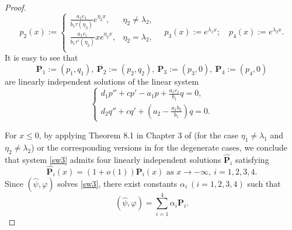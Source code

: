\documentclass[reqno]{amsart}
\theoremstyle{plain}
\theoremstyle{definition}
\theoremstyle{remark}
\begin{document}
\begin{proof}
\[		p_2(x):= \begin{cases}
			\frac{a_1c_1}{b_1\tau(\eta_2)}e^{\eta_2 x}, &  \eta_2 \neq \lambda_2,\\
			\frac{a_1c_1}{b_1\tau'(\eta_2)}xe^{\eta_2 x}, &  \eta_2 = \lambda_2,\\
		\end{cases} \quad
		p_3(x) := e^{\lambda_1 x}; \quad p_4(x) := e^{\lambda_2 x}.
		\]
		It is easy to see that 
		\[
		\mathbf{P}_1 := (p_1, q_1), ~ \mathbf{P}_2 := (p_2, q_2),~\mathbf{P}_3 := (p_3, 0),~\mathbf{P}_4 := (p_4, 0)
		\]
		are linearly independent solutions of the linear system
		\[
		\begin{cases}
			d_1 p'' + c p ' -a_1 p + \frac{a_1c_1}{b_1} q = 0,\\
			d_2 q '' + c q ' + (a_2 - \frac{a_1b_2}{b_1}) q  = 0.
		\end{cases}  
		\]            
		
		For $x \le 0$, by applying Theorem 8.1 in Chapter 3 of \cite{MR69338} (for the case $\eta_1 \neq \lambda_1$ and $\eta_2 \neq \lambda_2$) or the corresponding versions in \cite{MR658490} for the degenerate cases, we conclude that system \eqref{sw3} admits four linearly independent solutions \(\hat{\mathbf{P}}_i\) satisfying 
		\[
		\hat{\mathbf{P}}_i(x) = (1 + o(1))\mathbf{P}_i (x) \text{ as } x \to -\infty, ~ i = 1,2,3,4. 
		\]
		Since \((\hat\psi, \varphi)\) solves \eqref{sw3}, there exist constants \(\alpha_i ~ (i=1,2,3,4)\) such that 
		\[
		(\hat\psi, \varphi) = \sum_{i=1}^{4} \alpha_i \mathbf{P}_i.
		\]
		

\end{proof}
\end{document}
